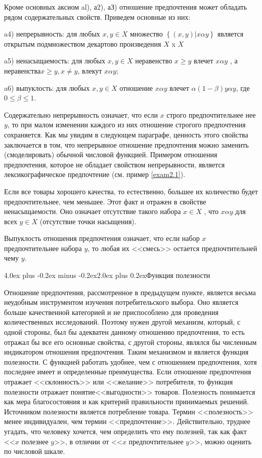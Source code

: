 \documentclass[12pt, 4paper]{book}
\makeatletter
\renewcommand{\section}{\@startsection{section}{1}{1pt}%
	{4.0ex plus -0.2ex minus -0.2ex}{2.0ex plus 0.2ex}{\centering\bf}}%
\makeatother
\begin{document}
{Кроме основных аксиом al), а2), аЗ) отношение предпочтения может обладать рядом содержательных свойств. Приведем основные из них:

a4) непрерывность: для любых $x,y \in X $ множество $\left\{(x,y)|x \alpha y \right\}$ является открытым подмножеством декартово произведения $X$ x $X$

a5) ненасыщаемость: для любых $x,y \in X $ неравенство $x\geq y$ влечет $x \alpha y$ , а неравенства$x\geq y,x \neq y $, влекут $x \alpha y$;

a6) выпуклость: для любых $x,y \in X $ отношение $x \alpha y$ влечет $ \alpha (1-\beta)y \alpha y$, где $0\leq \beta \leq 1$.

Содержательно непрерывность означает, что если $x$ строго предпочтительнее нее $y$, то при малом изменении каждого из них отношение строгого предпочтения сохраняется. Как мы увидим в следующем параграфе, ценность этого свойства заключается в том, что непрерывное отношение предпочтения можно заменить (смоделировать) обычной числовой функцией. Примером отношения предпочтения, которое не обладает свойством непрерывности, является лексикографическое предпочтение (см. пример \ref{exam2.1}).

Если все товары хорошего качества, то естественно, большее их количество будет предпочтительнее, чем меньшее. Этот факт и отражен в свойстве ненасыщаемости. Оно означает отсутствие такого набора $x \in X$ , что $x \alpha y $ для всех $y \in X$ (отсутствие точки насыщения).

Выпуклость отношения предпочтения означает, что если набор $x$ предпочтительнее набора $y$, то любая их <<смесь>> остается предпочтительней чему $y$.

\section {Функция полезности}

Отношение предпочтения, рассмотренное в предыдущем пункте, является весьма неудобным инструментом изучения потребительского выбора. Оно является больше качественной категорией и не приспособлено для проведения количественных исследований. Поэтому нужен другой механизм, который, с одной стороны, был бы адекватен данному отношению предпочтения, то есть отражал бы все его основные свойства, с другой стороны, являлся бы численным индикатором отношения предпочтения. Таким механизмом и является функция полезности. С функцией работать удобнее, чем с отношением предпочтения, хотя последнее имеет и определенные преимущества. Если отношение предпочтения отражает <<склонность>> или <<желание>> потребителя, то функция полезности отражает понятие<<выгодности>> товаров. Полезность понимается как мера благосостояния и как критерий правильности принимаемых решений. Источником полезности является потребление товара. Термин <<полезность>> менее индивидуален, чем термин <<предпочтение>>. Действительно, труднее угадать, что человеку хочется, чем определить что ему полезней, так как факт <<$x$ полезнее $y$>>, в отличии от <<$x$ предпочтительнее $y$>>, можно оценить по числовой шкале.

}
\end{document}

